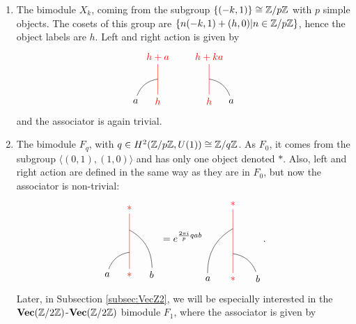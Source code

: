 	\begin{enumerate}
		\item The bimodule $X_k$, coming from the subgroup $\{(-k,1)\}\cong\mathbb{Z}/p\mathbb{Z}$ with $p$ simple objects. The cosets of this group are $\{n(-k,1)+(h,0)|n\in\mathbb{Z}/p\mathbb{Z}\}$, hence the object labels are $h$. Left and right action is given by 
			\begin{equation}
				\begin{tikzpicture}[scale=0.8,baseline=(current bounding box.center)]
				\node[red](m) at (0,0) {$h$};
				\node(b) at (-1,0) {$a$};
				\node[red](abm) at (0,2) {$h+a$};
				\draw[red] (m)-- (abm);
				\draw (b) to [bend left] (0,1);
				\end{tikzpicture}\hspace{20pt}
				\begin{tikzpicture}[scale=0.8,baseline=(current bounding box.center)]
				\node[red](m) at (0,0) {$h$};
				\node(b) at (1,0) {$a$};
				\node[red](abm) at (0,2) {$h+ka$};
				\draw[red] (m)-- (abm);
				\draw (b) to [bend right] (0,1);
				\end{tikzpicture}
			\end{equation}
		\noindent
		and the associator is again trivial.
		\item The bimodule $F_q$, with $q\in H^2(\mathbb{Z}/p\mathbb{Z},U(1))\cong\mathbb{Z}/q\mathbb{Z}$. As $F_0$, it comes from the subgroup $\langle(0,1),(1,0)\rangle$ and has only one object denoted $*$. Also, left and right action are defined in the same way as they are in $F_0$, but now the associator is non-trivial:
			\begin{equation}
				\begin{tikzpicture}[scale=0.8,baseline=(current bounding box.center)]
				\node[red](m) at (0,0) {$*$};
				\node(a) at (-1,0) {$a$};
				\node(b) at (1,0) {$b$};
				\node[red](abm) at (0,3) {$*$};
				\draw[red] (m) -- (abm);
				\draw (a) to [bend left] (0,1);
				\draw (b) to [bend right] (0,2);
				\end{tikzpicture}\ =e^{\frac{2\pi i}{p}qab}
				\begin{tikzpicture}[scale=0.9,baseline=(current bounding box.center)]
				\node[red](m) at (0,0) {$*$};
				\node(a) at (-1,0) {$a$};
				\node(b) at (1,0) {$b$};
				\node[red](abm) at (0,3) {$*$};
				\draw[red] (m) -- (abm);
				\draw (b) to [bend right] (0,1);
				\draw (a) to [bend left] (0,2);
				\end{tikzpicture}.
			\end{equation}
		Later, in Subsection \ref{subsec:VecZ2}, we will be especially interested in the $\textbf{Vec}(\mathbb{Z}/2\mathbb{Z})$-$\textbf{Vec}(\mathbb{Z}/2\mathbb{Z})$ bimodule $F_1$, where the associator is given by

\end{enumerate}
